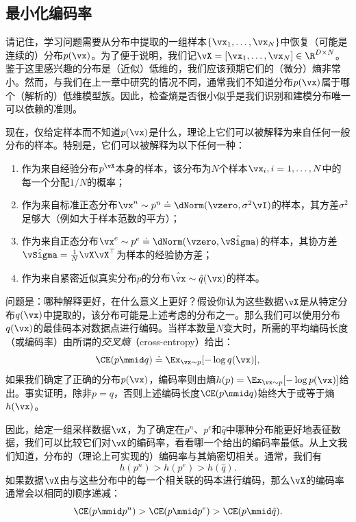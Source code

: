 \documentclass[../../book-main_zh.tex]{subfiles}
\begin{document}
\subsection{最小化编码率}\label{sub:min_entropy}
请记住，学习问题需要从分布中提取的一组样本\(\{\vx_{1}, \ldots, \vx_{N}\}\)中恢复（可能是连续的）分布\(p(\vx)\)。为了便于说明，我们记\(\vX = [\vx_{1}, \ldots, \vx_{N}]
\in \R^{D\times N}\)。鉴于这里感兴趣的分布是（近似）低维的，我们应该预期它们的（微分）熵非常小。然而，与我们在上一章中研究的情况不同，通常我们不知道分布\(p(\vx)\)属于哪个（解析的）低维模型族。因此，检查熵是否很小似乎是我们识别和建模分布唯一可以依赖的准则。

现在，仅给定样本而不知道\(p(\vx)\)是什么，理论上它们可以被解释为来自任何一般分布的样本。特别是，它们可以被解释为以下任何一种：
\begin{enumerate}
    \item 作为来自经验分布\(p^{\vX}\)本身的样本，该分布为\(N\)个样本\(\vx_{i}, i=1, \ldots, N\)中的每一个分配\(1/N\)的概率；
    \item 作为来自标准正态分布\(\vx^{n}
        \sim p^{n} \doteq \dNorm(\vzero, \sigma^{2} \vI)\)的样本，其方差\(\sigma^{2}\)足够大（例如大于样本范数的平方）；
    \item 作为来自正态分布\(\vx^{e} \sim p^{e}
        \doteq \dNorm(\vzero, \hat{\vSigma})\)的样本，其协方差\(\hat{\vSigma} = \frac{1}{N} \vX \vX^{\top}\)为样本的经验协方差；
    \item 作为来自紧密近似真实分布\(p\)的分布\(\hat \vx \sim
        \hat{q}(\vx)\)的样本。
\end{enumerate}
问题是：哪种解释更好，在什么意义上更好？假设你认为这些数据\(\vX\)是从特定分布\(q(\vx)\)中提取的，该分布可能是上述考虑的分布之一。那么我们可以使用分布\(q(\vx)\)的最佳码本对数据点进行编码。当样本数量\(N\)变大时，所需的平均编码长度（或编码率）由所谓的\textit{交叉熵}（cross-entropy）给出：
\begin{equation}
    \CE(p \mmid q) \doteq \Ex_{\vx \sim p}[-\log q(\vx)],
\end{equation}
如果我们确定了正确的分布\(p(\vx)\)，编码率则由熵\(h(p) = \Ex_{\vx \sim p}[-\log p(\vx)]\)给出。事实证明，除非\(p = q\)，否则上述编码长度\(\CE(p \mmid q)\)始终大于或等于熵\(h(\vx)\)。

因此，给定一组采样数据\(\vX\)，为了确定在\(p^{n}\)、\(p^{e}\)和\(\hat{q}\)中哪种分布能更好地表征数据，我们可以比较它们对\(\vX\)的编码率，看看哪一个给出的编码率最低。从上文我们知道，分布的（理论上可实现的）编码率与其熵密切相关。通常，我们有
\begin{equation}
    h(p^{n}) > h(p^{e}) > h(\hat{q}).
\end{equation}
如果数据\(\vX\)由与这些分布中的每一个相关联的码本进行编码，那么\(\vX\)的编码率通常会以相同的顺序递减：
\begin{equation}
    \CE(p \mmid p^{n}) > \CE(p \mmid p^{e}) > \CE(p \mmid \hat{q}).
\end{equation}
\end{document}
